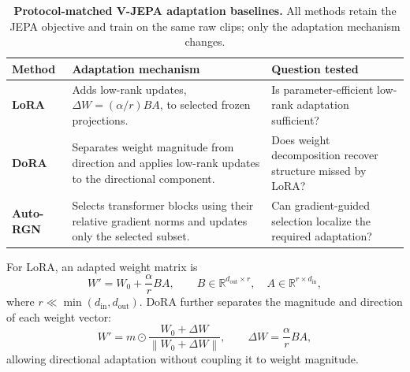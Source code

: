 \begin{table}[ht!]
\centering
\caption{
\textbf{Protocol-matched V-JEPA adaptation baselines.}
All methods retain the JEPA objective and train on the same raw clips; only the adaptation mechanism changes.
}
\label{tab:vjepa_adaptation_baselines}
\scriptsize
\setlength{\tabcolsep}{3pt}
\renewcommand{\arraystretch}{1.08}
\begin{tabular}{
    p{}
    p{}
    p{}
}
\toprule
\textbf{Method} & \textbf{Adaptation mechanism} & \textbf{Question tested} \\
\midrule

\textbf{LoRA}~\cite{hu2022lora}
&
Adds low-rank updates,
$\Delta W=(\alpha/r)BA$, to selected frozen projections.
&
Is parameter-efficient low-rank adaptation sufficient?
\\
\midrule

\textbf{DoRA}~\cite{liu2024dora}
&
Separates weight magnitude from direction and applies low-rank updates to the directional component.
&
Does weight decomposition recover structure missed by LoRA?
\\
\midrule

\textbf{Auto-RGN}~\cite{lee2023surgical}
&
Selects transformer blocks using their relative gradient norms and updates only the selected subset.
&
Can gradient-guided selection localize the required adaptation?
\\

\bottomrule
\end{tabular}
\end{table}


For LoRA, an adapted weight matrix is
\[
W' = W_0 + \frac{\alpha}{r}BA,
\qquad
B\in\mathbb{R}^{d_{\mathrm{out}}\times r},
\quad
A\in\mathbb{R}^{r\times d_{\mathrm{in}}},
\]
where $r\ll\min(d_{\mathrm{in}},d_{\mathrm{out}})$. DoRA further separates the magnitude and direction of each weight vector:
\[
W'
=
m\odot
\frac{W_0+\Delta W}
{\left\|W_0+\Delta W\right\|},
\qquad
\Delta W=\frac{\alpha}{r}BA,
\]
allowing directional adaptation without coupling it to weight magnitude.

